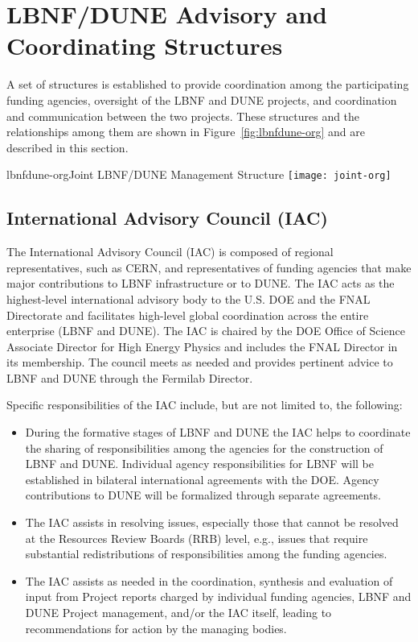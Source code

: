 \section{LBNF/DUNE Advisory and Coordinating Structures}
\label{sec:lbnf-dune-interface}

A set of structures is established to provide coordination among the participating funding agencies, oversight of the LBNF and DUNE projects, and coordination and communication between the two projects.  These structures and the relationships among them are shown in Figure~\ref{fig:lbnfdune-org} and are described in this section.

\begin{cdrfigure}{lbnfdune-org}{Joint LBNF/DUNE Management Structure}
  \texttt{[image: joint-org]}
\end{cdrfigure}


\subsection{International Advisory Council (IAC) }

The International Advisory Council (IAC) is composed of
regional representatives, such as CERN, and representatives of
funding agencies that make major contributions to LBNF infrastructure or to DUNE. The IAC 
acts as the highest-level international advisory body to the U.S.
DOE and the FNAL Directorate and facilitates
high-level global coordination across the entire enterprise (LBNF and DUNE).
The IAC is chaired by the DOE Office of Science Associate Director
for High Energy Physics and includes the FNAL Director in its membership.  
The council meets as needed and provides pertinent advice to 
LBNF and DUNE  
through the Fermilab Director.  


Specific responsibilities of the IAC include, but are not limited to,
the following:


\begin{itemize}
\item During the formative stages of LBNF and DUNE
the IAC helps to coordinate the sharing of responsibilities among
the agencies for the construction of LBNF and DUNE.
Individual agency responsibilities for LBNF will be established in
bilateral international agreements with the DOE. Agency contributions to
DUNE will be formalized through separate agreements.

\item The IAC assists in resolving issues, especially those
that cannot be resolved at the Resources Review Boards (RRB) level,
e.g., issues that require substantial redistributions of
responsibilities among the funding agencies.

\item The IAC assists as needed in the coordination,
synthesis and evaluation of input from Project reports charged by
individual funding agencies, LBNF and DUNE Project management,
and/or the IAC itself, leading to recommendations for action by
the managing bodies.
\end{itemize}

